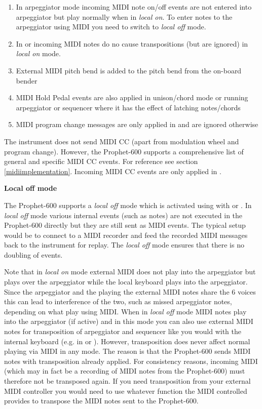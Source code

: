 \begin{enumerate}
  \setlength\itemsep{0cm}
  \item In arpeggiator mode incoming MIDI note on/off events are not entered into arpeggiator but play normally when in \textit{local on}. To enter notes to the arpeggiator using MIDI you need to switch to \textit{local off} mode. 
  \item In \shiftmode or \shiftlock incoming MIDI notes do no cause transpositions (but are ignored) in \textit{local on} mode. 
  \item External MIDI pitch bend is added to the pitch bend from the on-board bender 
  \item MIDI Hold Pedal events are also applied in unison/chord mode or running arpeggiator or sequencer where it has the effect of latching notes/chords
  \item MIDI program change messages are only applied in \presetmode and are ignored otherwise  
\end{enumerate}

The instrument does not send MIDI CC (apart from modulation wheel and program change). However, the Prophet-600 supports a comprehensive list of general and specific MIDI CC events. For reference see section \ref{midiimplementation}. Incoming MIDI CC events are only applied in \presetmode.

\textbf{Local off mode}

The Prophet-600 supports a \textit{local off} mode which is activated using  with \shiftmode or \shiftlock. In \textit{local off} mode various internal events (such as notes) are not executed in the Prophet-600 directly but they are still sent as MIDI events. The typical setup would be to connect to a MIDI recorder and feed the recorded MIDI messages back to the instrument for replay. The \textit{local off} mode ensures that there is no doubling of events.

Note that in \textit{local on} mode external MIDI does not play into the arpeggiator but plays over the arpeggiator while the local keyboard plays into the arpeggiator. Since the arpeggiator and the playing the external MIDI notes share the 6 voices this can lead to interference of the two, such as missed arpeggiator notes, depending on what play using MIDI. When in \textit{local off} mode MIDI notes play into the arpeggiator (if active) and in this mode you can also use external MIDI notes for transposition of arpeggiator and sequencer like you would with the internal keyboard (e.g. in \shiftmode or \shiftlock). However, transposition does never affect normal playing via MIDI in any mode. The reason is that the Prophet-600 sends MIDI notes with transposition already applied. For consistency reasons, incoming MIDI (which may in fact be a recording of MIDI notes from the Prophet-600) must therefore not be transposed again. If you need transposition from your external MIDI controller you would need to use whatever function the MIDI controlled provides to transpose the MIDI notes sent to the Prophet-600.


